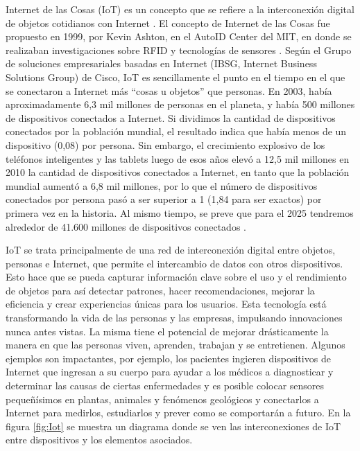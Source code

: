 Internet de las Cosas (IoT) es un concepto que se refiere a la interconexión digital de objetos cotidianos con Internet \citep{WEBSITE:IOTDefinicion}. El concepto de Internet de las Cosas fue propuesto en 1999, por Kevin Ashton, en el AutoID Center del MIT, en donde se realizaban investigaciones sobre RFID y tecnologías de sensores \citep{WEBSITE:IOTMIT}. Según el Grupo de soluciones empresariales basadas en Internet (IBSG, Internet Business Solutions Group) de Cisco, IoT es sencillamente el punto en el tiempo en el que se conectaron a Internet más ``cosas u objetos'' que personas. En 2003, había aproximadamente 6,3 mil millones de personas en el planeta, y había 500 millones de dispositivos conectados a Internet. Si dividimos la cantidad de dispositivos conectados por la población mundial, el resultado indica que había menos de un dispositivo (0,08) por persona. Sin embargo, el crecimiento explosivo de los teléfonos inteligentes y las tablets luego de esos años elevó a 12,5 mil millones en 2010 la cantidad de dispositivos conectados a Internet, en tanto que la población mundial aumentó a 6,8 mil millones, por lo que el número de dispositivos conectados por persona pasó a ser superior a 1 (1,84 para ser exactos) por primera vez en la historia. Al mismo tiempo, se preve que para el 2025 tendremos alrededor de 41.600 millones de dispositivos conectados \citep{WEBSITE:IOTFechas}.

IoT se trata principalmente de una red de interconexión digital entre objetos, personas e Internet, que permite el intercambio de datos con otros dispositivos. Esto hace que se pueda capturar información clave sobre el uso y el rendimiento de objetos para así detectar patrones, hacer recomendaciones, mejorar la eficiencia y crear experiencias únicas para los usuarios. Esta tecnología está transformando la vida de las personas y las empresas, impulsando innovaciones nunca antes vistas. La misma tiene el potencial de mejorar drásticamente la manera en que las personas viven, aprenden, trabajan y se entretienen. Algunos ejemplos son impactantes, por ejemplo, los pacientes ingieren dispositivos de Internet que ingresan a su cuerpo para ayudar a los médicos a diagnosticar y determinar las causas de ciertas enfermedades y es posible colocar sensores pequeñísimos en plantas, animales y fenómenos geológicos y conectarlos a Internet para medirlos, estudiarlos y prever como se comportarán a futuro. En la figura \ref{fig:Iot} se muestra un diagrama donde se ven las interconexiones de IoT entre dispositivos y los elementos asociados.

